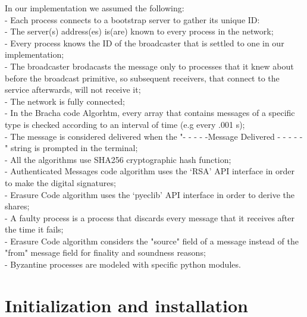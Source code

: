\documentclass[12pt]{article}
\begin{document}
In our implementation we assumed the following: \\
- Each process connects to a bootstrap server to gather its unique ID:\\
- The server(s) address(es) is(are) known to every process in the network; \\
- Every process knows the ID of the broadcaster that is settled to one in our implementation; \\
- The broadcaster brodacasts the message only to processes that it knew about before the broadcast primitive, so subsequent receivers, that connect to the service afterwards, will not receive it; \\
- The network is fully connected; \\
- In the Bracha code Algorhtm, every array that contains messages of a specific type is checked according to an interval of time (e.g every .001 s); \\
- The message is considered delivered when the "- - - - -Message Delivered - - - - -" string is prompted in the terminal; \\
- All the algorithms use SHA256 cryptographic hash function; \\
- Authenticated Messages code algorithm uses the ‘RSA’ API interface in order to make the digital signatures; \\
- Erasure Code algorithm uses the ‘pyeclib’ API interface in order to derive the shares; \\
- A faulty process is a process that discards every message that it receives after the time it fails; \\
- Erasure Code algorithm considers the "source" field of a message instead of the "from" message field for finality and soundness reasons; \\
- Byzantine processes are modeled with specific python modules. \\

\newpage

\section{Initialization and installation}
\end{document}
